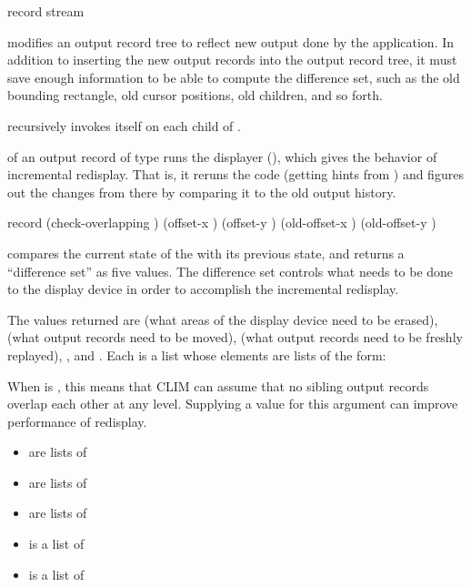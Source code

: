 {record stream}

 modifies an output record tree to reflect new
output done by the application.  In addition to inserting the new output records
into the output record tree, it must save enough information to be able to
compute the difference set, such as the old bounding rectangle, old cursor
positions, old children, and so forth.

 recursively invokes itself on each child of
.

 of an output record of type
 runs the displayer (),
which gives the behavior of incremental redisplay.  That is, it reruns the code
(getting hints from ) and figures out the changes from there
by comparing it to the old output history.


 {record \optional (check-overlapping )
                                      (offset-x ) (offset-y )
                                      (old-offset-x ) (old-offset-y )} 

 compares the current state of the   with its previous state, and returns a ``difference set''
as five values.  The difference set controls what needs to be done to the
display device in order to accomplish the incremental redisplay.

The values returned are  (what areas of the display device need to
be erased),  (what output records need to be moved), 
(what output records need to be freshly replayed), , and
.  Each is a list whose elements are lists of the form:

When  is , this means that CLIM can assume
that no sibling output records overlap each other at any level.  Supplying a
 value for this argument can improve performance of redisplay.


\begin{itemize}
\item {} are lists of 

\item {} are lists of 

\item {} are lists of 

\item {} is a list of 

\item {} is a list of 
\end{itemize}

